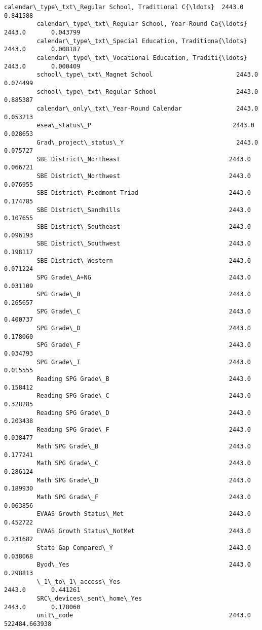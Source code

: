 \documentclass[11pt]{article}
\begin{document}
\begin{Verbatim}[commandchars=\\\{\}]
         calendar\_type\_txt\_Regular School, Traditional C{\ldots}  2443.0       0.841588   
         calendar\_type\_txt\_Regular School, Year-Round Ca{\ldots}  2443.0       0.043799   
         calendar\_type\_txt\_Special Education, Traditiona{\ldots}  2443.0       0.008187   
         calendar\_type\_txt\_Vocational Education, Traditi{\ldots}  2443.0       0.000409   
         school\_type\_txt\_Magnet School                       2443.0       0.074499   
         school\_type\_txt\_Regular School                      2443.0       0.885387   
         calendar\_only\_txt\_Year-Round Calendar               2443.0       0.053213   
         esea\_status\_P                                       2443.0       0.028653   
         Grad\_project\_status\_Y                               2443.0       0.075727   
         SBE District\_Northeast                              2443.0       0.066721   
         SBE District\_Northwest                              2443.0       0.076955   
         SBE District\_Piedmont-Triad                         2443.0       0.174785   
         SBE District\_Sandhills                              2443.0       0.107655   
         SBE District\_Southeast                              2443.0       0.096193   
         SBE District\_Southwest                              2443.0       0.198117   
         SBE District\_Western                                2443.0       0.071224   
         SPG Grade\_A+NG                                      2443.0       0.031109   
         SPG Grade\_B                                         2443.0       0.265657   
         SPG Grade\_C                                         2443.0       0.400737   
         SPG Grade\_D                                         2443.0       0.178060   
         SPG Grade\_F                                         2443.0       0.034793   
         SPG Grade\_I                                         2443.0       0.015555   
         Reading SPG Grade\_B                                 2443.0       0.158412   
         Reading SPG Grade\_C                                 2443.0       0.328285   
         Reading SPG Grade\_D                                 2443.0       0.203438   
         Reading SPG Grade\_F                                 2443.0       0.038477   
         Math SPG Grade\_B                                    2443.0       0.177241   
         Math SPG Grade\_C                                    2443.0       0.286124   
         Math SPG Grade\_D                                    2443.0       0.189930   
         Math SPG Grade\_F                                    2443.0       0.063856   
         EVAAS Growth Status\_Met                             2443.0       0.452722   
         EVAAS Growth Status\_NotMet                          2443.0       0.231682   
         State Gap Compared\_Y                                2443.0       0.038068   
         Byod\_Yes                                            2443.0       0.298813   
         \_1\_to\_1\_access\_Yes                                  2443.0       0.441261   
         SRC\_devices\_sent\_home\_Yes                           2443.0       0.178060   
         unit\_code                                           2443.0  522484.663938   
         

\end{Verbatim}
\end{document}
